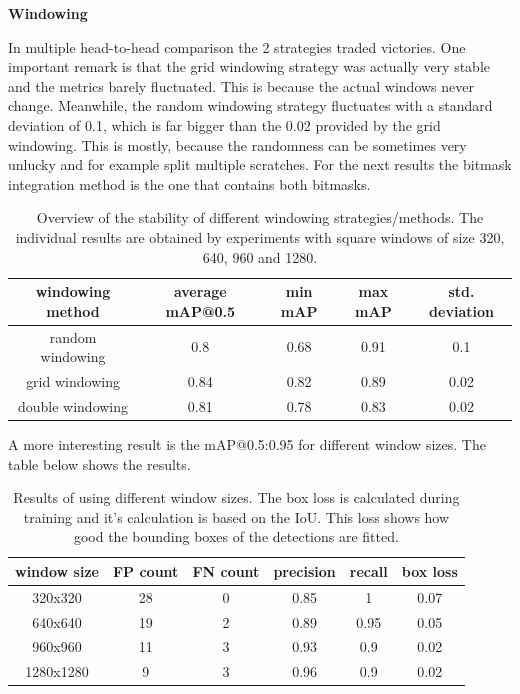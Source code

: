 \textbf{Windowing}

In multiple head-to-head comparison the 2 strategies traded victories. One important remark is that the grid windowing strategy was actually very stable and the metrics barely fluctuated. This is because the actual windows never change. Meanwhile, the random windowing strategy fluctuates with a standard deviation of 0.1, which is far bigger than the 0.02 provided by the grid windowing. This is mostly, because the randomness can be sometimes very unlucky and for example split multiple scratches. For the next results the bitmask integration method is the one that contains both bitmasks.\\

\begin{table}
\centering
\begin{tabular}{ ||c|c|c|c|c||}
\hline
windowing method & average mAP@0.5 & min mAP & max mAP & std. deviation\\ [0.5ex]
\hline\hline
random windowing & 0.8 & 0.68 & 0.91 & 0.1 \\
grid windowing & 0.84  & 0.82 & 0.89 & 0.02 \\
double windowing & 0.81  & 0.78 & 0.83 & 0.02 \\
\hline
\end{tabular}
\caption{Overview of the stability of different windowing strategies/methods. The individual results are obtained by experiments with square windows of size 320, 640, 960 and 1280.}
\label{impl:win_strategy}
\end{table}

A more interesting result is the mAP@0.5:0.95 for different window sizes. The table below shows the results.


\begin{table}
\centering
\begin{tabular}{ ||c|c|c|c|c|c||}
\hline
window size & FP count & FN count & precision & recall & box loss\\ [0.5ex]
\hline\hline
320x320 & 28 & 0 & 0.85 & 1 & 0.07\\
640x640 & 19 & 2 & 0.89 & 0.95 & 0.05\\
960x960 & 11 & 3 & 0.93 & 0.9 & 0.02\\
1280x1280 & 9 & 3 & 0.96 & 0.9 & 0.02\\
\hline
\end{tabular}
\caption{Results of using different window sizes. The box loss is calculated during training and it's calculation is based on the IoU. This loss shows how good the bounding boxes of the detections are fitted. }
\label{impl:win_size}
\end{table}

